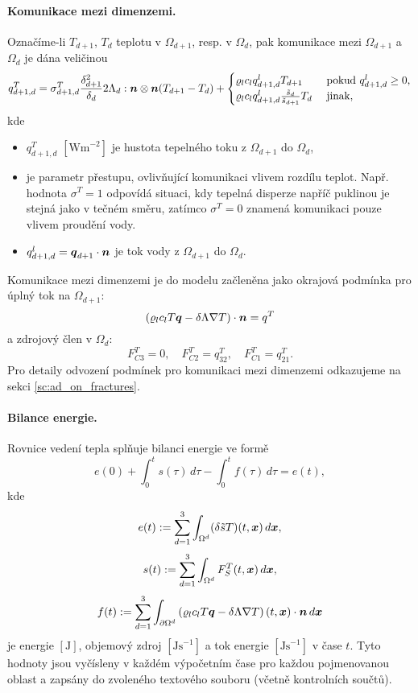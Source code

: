 \paragraph{Komunikace mezi dimenzemi.}
Označíme-li $T_{d+1}$, $T_d$ teplotu v $\Omega_{d+1}$, resp. v $\Omega_d$, pak komunikace mezi $\Omega_{d+1}$ a $\Omega_d$ je dána veličinou
\begin{equation}
  \label{e:inter_dim_flux_heat}
  q^T_{d+1,d} = \sigma^T_{d+1,d} \frac{\delta_{d+1}^2}{\delta_d}2\Lambda_d:\mathbf{\boldsymbol{n}}\otimes\mathbf{\boldsymbol{n}} ( T_{d+1} - T_d)
  + \begin{cases} \varrho_l c_l q^l_{d+1,d} T_{d+1} & \mbox{ pokud }q^l_{d+1,d}\ge 0,\\\varrho_l c_l q^l_{d+1,d} \frac{\tilde s_d}{\tilde s_{d+1}} T_d & \mbox{ jinak},\end{cases}
\end{equation}
kde
\begin{itemize}
\item $q^T_{d+1,d}$ $[\mathrm{Wm}^{-2}]$ je hustota tepelného toku z $\Omega_{d+1}$ do $\Omega_d$,
\item {} \units{}{}{} je parametr přestupu, ovlivňující komunikaci vlivem rozdílu teplot.
Např. hodnota $\sigma^T=1$ odpovídá situaci, kdy tepelná disperze napříč puklinou je stejná jako v tečném směru, zatímco $\sigma^T=0$ znamená komunikaci pouze vlivem proudění vody.
\item $q^l_{d+1,d}=\mathbf{\boldsymbol{q}}_{d+1}\cdot\mathbf{\boldsymbol{n}}$ je tok vody z $\Omega_{d+1}$ do $\Omega_d$.
\end{itemize}
Komunikace mezi dimenzemi je do modelu začleněna jako okrajová podmínka pro úplný tok na $\Omega_{d+1}$:
\begin{equation}
\label{e:heat_FC}
\left(\varrho_l c_l T \mathbf{\boldsymbol{q}} - \delta\Lambda\nabla T\right)\cdot\mathbf{\boldsymbol{n}} = q^T
\end{equation}
a zdrojový člen v $\Omega_d$:
\begin{equation}
F^T_{C3} = 0,\quad
F^T_{C2} = q^T_{32},\quad
F^T_{C1} = q^T_{21}.
\end{equation}
Pro detaily odvození podmínek pro komunikaci mezi dimenzemi odkazujeme na sekci \ref{sc:ad_on_fractures}.



\paragraph{Bilance energie.}
Rovnice vedení tepla splňuje bilanci energie ve formě
$$ e(0) + \int_0^t s(\tau) \,d\tau - \int_0^t f(\tau) \,d\tau = e(t), $$
kde
$$ e(t) := \sum_{d=1}^3\int_{\Omega^d}(\delta \tilde s T)(t,\mathbf{\boldsymbol{x}})\,d\mathbf{\boldsymbol{x}}, $$
$$ s(t) := \sum_{d=1}^3\int_{\Omega^d}F_S^T(t,\mathbf{\boldsymbol{x}})\,d\mathbf{\boldsymbol{x}}, $$
$$ f(t) := \sum_{d=1}^3\int_{\partial\Omega^d}\left(\varrho_l c_l T\mathbf{\boldsymbol{q}} - \delta\Lambda\nabla T\right)(t,\mathbf{\boldsymbol{x}})\cdot\mathbf{\boldsymbol{n}} \,d\mathbf{\boldsymbol{x}} $$
je energie $[\mathrm{J}]$, objemový zdroj $[\mathrm{Js}^{-1}]$ a tok energie $[\mathrm{Js}^{-1}]$ v čase $t$.
Tyto hodnoty jsou vyčísleny v každém výpočetním čase pro každou pojmenovanou oblast a zapsány do zvoleného textového souboru (včetně kontrolních součtů).





